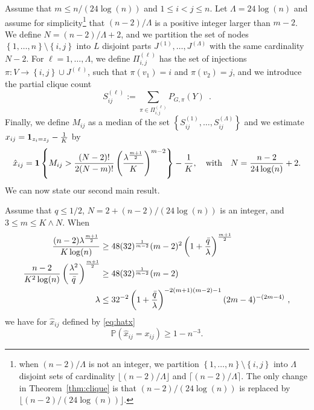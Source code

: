 \documentclass[final]{colt2026}
\newcommand{\1}{\mathbf{1}}
\newcommand{\bbP}{\mathbb{P}}
\newcommand{\pa}[1]{\left(#1\right)}
\newcommand{\ac}[1]{\left\{#1\right\}}
\begin{document}
Assume that $m\leq n/(24 \log(n))$ and $1\leq i < j \leq n$. 
Let $\Lambda=24\log(n)$ and assume for simplicity\footnote{when $(n-2)/\Lambda$ is not an integer, we partition $\ac{1,\ldots,n}\setminus\ac{i,j}$ into $\Lambda$ disjoint sets of cardinality $\lfloor (n-2)/\Lambda\rfloor$ and $\lceil (n-2)/\Lambda\rceil$. The only change in Theorem~\ref{thm:clique} is that $(n-2)/(24 \log (n))$ is replaced by $\lfloor (n-2)/(24\log (n))\rfloor$.} that $(n-2)/\Lambda$ is a positive integer larger than $m-2$. We define $N=(n-2)/\Lambda+2$, and we partition the set of nodes $\ac{1,\ldots,n}\setminus\ac{i,j}$ into $L$ disjoint parts $J^{(1)},\ldots,J^{(\Lambda)}$ with the same cardinality $N-2$. For $\ell=1,\ldots, \Lambda$, we define $\Pi_{i,j}^{(\ell)}$ has the set of injections $\pi:V\to \ac{i,j}\cup J^{(\ell)}$, such that $\pi(v_{1})=i$ and $\pi(v_{2})=j$, and we introduce the partial clique count
\begin{equation}\label{eq:partial-clique}
S_{ij}^{(\ell)}:= \sum_{\pi \in \Pi_{i,j}^{(\ell)}} P_{G,\pi}(Y)\enspace .
\end{equation}
Finally, we define $M_{ij}$ as a median of the set $\ac{S^{(1)}_{ij},\ldots,S^{(\Lambda)}_{ij}}$
and we estimate $x_{ij}={\bf 1}_{z_{i}=z_{j}}-{1\over K}$ by 
\begin{equation}\label{eq:hatx}
\hat x_{ij}=\mathbf{1}\ac{M_{ij}> {(N-2)!\over 2(N-m)!} \pa{\lambda^{m+1\over 2} \over K}^{m-2}}-{1\over K},\quad \text{with}\quad N={n-2\over 24 \log(n)}+2.
\end{equation}
We can now state our second main result.
\begin{theorem}\label{thm:clique}
Assume that $q\leq 1/2$,  $N=2+(n-2)/(24\log(n))$ is an integer, and $3\leq m\leq K\wedge N$. When
\begin{align}
{(n-2) \lambda^{{m+1 \over 2}}\over  K \log(n)} & \geq 48 (32)^{1\over m-2} (m-2)^2 \pa{1+{\bar q\over \lambda}}^{m+1\over 2} \label{eq:cond1:MoM}\\
{n-2\over K^2 \log(n) }\pa{\lambda^2\over \bar q}^{{m+1\over 2}} & \geq 48 (32)^{1\over m-2} (m-2) \label{eq:cond2:MoM}\\
 \lambda& \leq 32^{-2}\pa{1+{\bar q\over \lambda}}^{-2(m+1)(m-2)-1}(2m-4)^{-(2m-4)}\ , \label{eq:lambda}
 \end{align}
we have for $\hat x_{ij}$ defined by \eqref{eq:hatx}
$$\bbP\pa{\hat x_{ij}=x_{ij}}\geq 1-n^{-3}.$$ 
\end{theorem}
\end{document}
